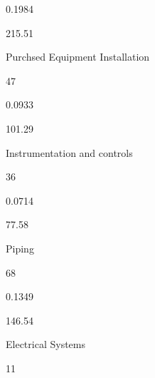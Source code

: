 \documentclass[a4paper,portrait,12pt]{article}
\begin{document}
0.1984





215.51





\begin{flushleft}
Purchsed Equipment Installation
\end{flushleft}





47





0.0933





101.29





\begin{flushleft}
Instrumentation and controls
\end{flushleft}





36





0.0714





77.58





\begin{flushleft}
Piping
\end{flushleft}





68





0.1349





146.54





\begin{flushleft}
Electrical Systems
\end{flushleft}





11
\end{document}

